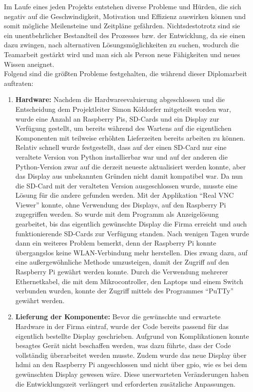 Im Laufe eines jeden Projekts entstehen diverse Probleme und Hürden, die sich negativ auf die Geschwindigkeit, Motivation und Effizienz auswirken können und somit mögliche Meilensteine und Zeitpläne gefährden. Nichtsdestotrotz sind sie ein unentbehrlicher Bestandteil des Prozesses bzw. der Entwicklung, da sie einen dazu zwingen, nach alternativen Lösungsmöglichkeiten zu suchen, wodurch die Teamarbeit gestärkt wird und man sich als Person neue Fähigkeiten und neues Wissen aneignet.\\ Folgend sind die größten Probleme festgehalten, die während dieser Diplomarbeit auftraten:

\begin{enumerate}
	\item \textbf{Hardware: }Nachdem die Hardwareevaluierung abgeschlossen und die Entscheidung dem Projektleiter Simon Köldorfer mitgeteilt worden war, wurde eine Anzahl an Raspberry Pis, SD-Cards und ein Display zur Verfügung gestellt, um bereits während des Wartens auf die eigentlichen Komponenten mit teilweise erhöhten Lieferzeiten bereits arbeiten zu können. Relativ schnell wurde festgestellt, dass auf der einen SD-Card nur eine veraltete Version von Python installierbar war und auf der anderen die Python-Version zwar auf die derzeit neueste aktualisiert werden konnte, aber das Display aus unbekannten Gründen nicht damit kompatibel war. Da nun die SD-Card mit der veralteten Version ausgeschlossen wurde, musste eine Lösung für die andere gefunden werden. Mit der Applikation \enquote{Real VNC Viewer} konnte, ohne Verwendung des Displays, auf den Raspberry Pi zugegriffen werden. So wurde mit dem Programm als Anzeigelösung gearbeitet, bis das eigentlich gewünschte Display die Firma erreicht und auch funktionierende SD-Cards zur Verfügung standen. Nach wenigen Tagen wurde dann ein weiteres Problem bemerkt, denn der Raspberry Pi konnte übergangslos keine WLAN-Verbindung mehr herstellen. Dies zwang dazu, auf eine außergewöhnliche Methode umzusteigen, damit der Zugriff auf den Raspberry Pi gewährt werden konnte. Durch die Verwendung mehrerer Ethernetkabel, die mit dem Mikrocontroller, den Laptops und einem Switch verbunden wurden, konnte der Zugriff mittels des Programmes \enquote{PuTTy} gewährt werden.
	\item \textbf{Lieferung der Komponente: } Bevor die gewünschte und erwartete Hardware in der Firma eintraf, wurde der Code bereits passend für das eigentlich bestellte Display geschrieben. Aufgrund von Komplikationen konnte besagtes Gerät nicht beschaffen werden, was dazu führte, dass der Code vollständig überarbeitet werden musste. Zudem wurde das neue Display über \gls{hdmi} an den Raspberry Pi angeschlossen und nicht über \gls{gpio}, wie es bei dem gewünschten Display gewesen wäre. Diese unerwarteten Veränderungen haben die Entwicklungszeit verlängert und erforderten zusätzliche Anpassungen.
	
\end{enumerate}
